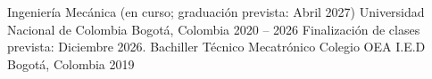 

\begin{cventries}

    \cventry
        {Ingeniería Mecánica (en curso; graduación prevista: Abril 2027)} %
        {Universidad Nacional de Colombia} %
        {Bogotá, Colombia} %
        {2020 -- 2026} %
        {Finalización de clases prevista: Diciembre 2026.}
    \cventry
        {Bachiller Técnico Mecatrónico} %
        {Colegio OEA I.E.D} %
        {Bogotá, Colombia} %
        {2019} %
        {}
\end{cventries}
